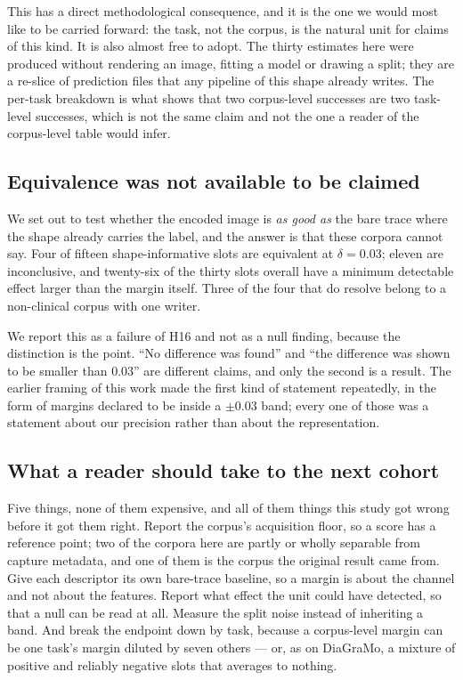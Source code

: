 This has a direct methodological consequence, and it is the one we would most like to be carried
forward: the task, not the corpus, is the natural unit for claims of this kind. It is also almost
free to adopt. The thirty estimates here were produced without rendering an image, fitting a model
or drawing a split; they are a re-slice of prediction files that any pipeline of this shape already
writes. The per-task breakdown is what shows that two corpus-level successes are two task-level
successes, which is not the same claim and not the one a reader of the corpus-level table would
infer.

\subsection{Equivalence was not available to be claimed}
\label{sec:discussion-equivalence}

We set out to test whether the encoded image is \emph{as good as} the bare trace where the shape
already carries the label, and the answer is that these corpora cannot say. Four of fifteen
shape-informative slots are equivalent at $\delta = 0.03$; eleven are inconclusive, and twenty-six
of the thirty slots overall have a minimum detectable effect larger than the margin itself. Three of
the four that do resolve belong to a non-clinical corpus with one writer.

We report this as a failure of H16 and not as a null finding, because the distinction is the point.
``No difference was found'' and ``the difference was shown to be smaller than $0.03$'' are different
claims, and only the second is a result. The earlier framing of this work made the first kind of
statement repeatedly, in the form of margins declared to be inside a $\pm 0.03$ band; every one of
those was a statement about our precision rather than about the representation.

\subsection{What a reader should take to the next cohort}
\label{sec:discussion-practice}

Five things, none of them expensive, and all of them things this study got wrong before it got them
right. Report the corpus's acquisition floor, so a score has a reference point; two of the corpora
here are partly or wholly separable from capture metadata, and one of them is the corpus the
original result came from. Give each descriptor its own bare-trace baseline, so a margin is about
the channel and not about the features. Report what effect the unit could have detected, so that a
null can be read at all. Measure the split noise instead of inheriting a band. And break the
endpoint down by task, because a corpus-level margin can be one task's margin diluted by seven
others --- or, as on DiaGraMo, a mixture of positive and reliably negative slots that averages to
nothing.

